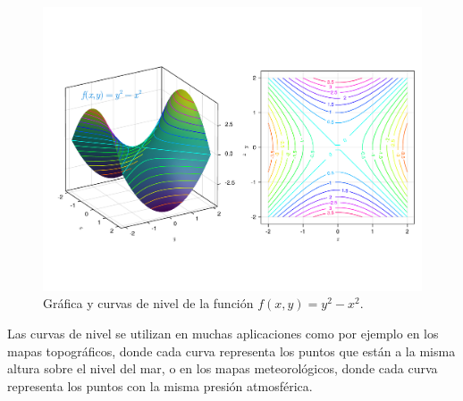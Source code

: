 \documentclass[
  a4paper,
]{scrreport}
\theoremstyle{definition}
\theoremstyle{plain}
\theoremstyle{plain}
\theoremstyle{definition}
\theoremstyle{definition}
\theoremstyle{plain}
\theoremstyle{remark}
\begin{document}
\begin{figure}

{\centering \includegraphics{./img/derivadas-funciones-varias-variables/curvas-nivel.pdf}

}

\caption{Gráfica y curvas de nivel de la función \(f(x,y) = y^2-x^2\).}

\end{figure}

Las curvas de nivel se utilizan en muchas aplicaciones como por ejemplo
en los mapas topográficos, donde cada curva representa los puntos que
están a la misma altura sobre el nivel del mar, o en los mapas
meteorológicos, donde cada curva representa los puntos con la misma
presión atmosférica.
\end{document}
